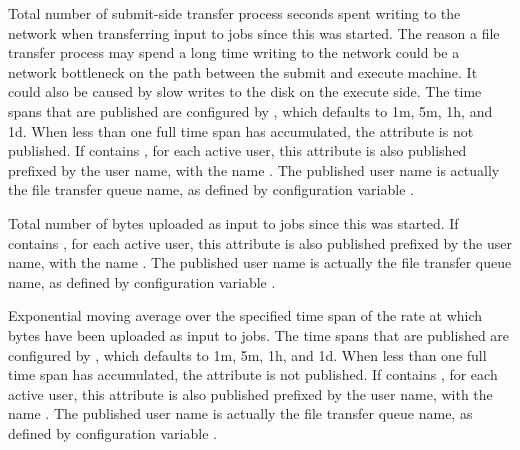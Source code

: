 \begin{description}
\item[\AdAttr{FileTransferNetWriteSeconds}] Total number of
  submit-side transfer process seconds spent writing to the network
  when transferring input to jobs since this  was
  started.  The reason a file transfer process may spend
  a long time writing to the network could be a network bottleneck on
  the path between the submit and execute machine.  It could also be
  caused by slow writes to the disk on the execute side.
  The time spans that are published are configured by
  , which defaults to
  1m, 5m, 1h, and 1d.  When less than one full time span has
  accumulated, the attribute is not published.
  If  contains ,
  for each active user, this attribute is also published prefixed by
  the user name, with the name
  .
  The published user name is actually the file transfer queue name, as
  defined by configuration variable .

\item[\AdAttr{FileTransferUploadBytes}] Total number of bytes uploaded
  as input to jobs since this  was started.
  If  contains ,
  for each active user, this attribute is also published prefixed by
  the user name, with the name
  .
  The published user name is actually the file transfer queue name, as
  defined by configuration variable .

\item[\AdAttr{FileTransferUploadBytesPerSecond\_<timespan>}]
  Exponential moving average over the specified time span of the rate
  at which bytes have been uploaded as input to jobs.
  The time spans that are published are configured by
  , which defaults to
  1m, 5m, 1h, and 1d.  When less than one full time span has
  accumulated, the attribute is not published.
  If  contains ,
  for each active user, this attribute is also published prefixed by
  the user name, with the name
  .
  The published user name is actually the file transfer queue name, as
  defined by configuration variable .


\end{description}
